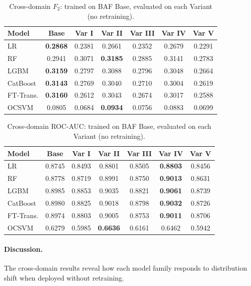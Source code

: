\begin{table}[ht!]
\centering
\caption{Cross-domain $F_2$: trained on BAF Base, evaluated on each Variant (no retraining).}
\label{tab:crossdomain_f2}
\begin{tabular}{l c c c c c c}
\toprule
Model & Base & Var I & Var II & Var III & Var IV & Var V \\
\midrule
LR         & \textbf{0.2868} & 0.2381 & 0.2661 & 0.2352 & 0.2679 & 0.2291 \\
RF         & 0.2941 & 0.3071 & \textbf{0.3185} & 0.2885 & 0.3141 & 0.2783 \\
LGBM       & \textbf{0.3159} & 0.2797 & 0.3088 & 0.2796 & 0.3048 & 0.2664 \\
CatBoost   & \textbf{0.3143} & 0.2769 & 0.3040 & 0.2710 & 0.3004 & 0.2619 \\
FT-Trans.  & \textbf{0.3160} & 0.2612 & 0.3043 & 0.2674 & 0.3017 & 0.2588 \\
OCSVM      & 0.0805 & 0.0684 & \textbf{0.0934} & 0.0756 & 0.0883 & 0.0699 \\
\bottomrule
\end{tabular}
\end{table}

\begin{table}[ht!]
\centering
\caption{Cross-domain ROC-AUC: trained on BAF Base, evaluated on each Variant (no retraining).}
\label{tab:crossdomain_rocauc}
\begin{tabular}{l c c c c c c}
\toprule
Model & Base & Var I & Var II & Var III & Var IV & Var V \\
\midrule
LR         & 0.8745 & 0.8493 & 0.8801 & 0.8505 & \textbf{0.8803} & 0.8456 \\
RF         & 0.8778 & 0.8719 & 0.8991 & 0.8750 & \textbf{0.9013} & 0.8631 \\
LGBM       & 0.8985 & 0.8853 & 0.9035 & 0.8821 & \textbf{0.9061} & 0.8739 \\
CatBoost   & 0.8980 & 0.8825 & 0.9018 & 0.8798 & \textbf{0.9032} & 0.8726 \\
FT-Trans.  & 0.8974 & 0.8803 & 0.9005 & 0.8753 & \textbf{0.9011} & 0.8706 \\
OCSVM      & 0.6279 & 0.5985 & \textbf{0.6636} & 0.6161 & 0.6462 & 0.5942 \\
\bottomrule
\end{tabular}
\end{table}

\paragraph{Discussion.}
The cross-domain results reveal how each model family responds to distribution shift when deployed without retraining.

